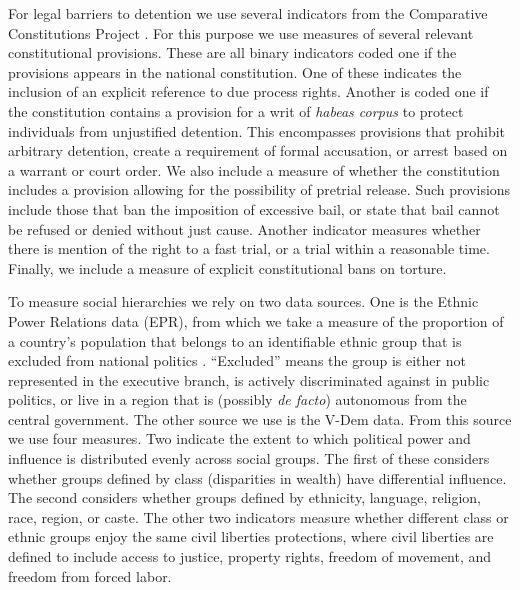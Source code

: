 \documentclass[11pt]{article}
\begin{document}
For legal barriers to detention we use several indicators from the Comparative Constitutions Project \citep{CCP2014}. For this purpose we use measures of several relevant constitutional provisions. These are all binary indicators coded one if the provisions appears in the national constitution. One of these indicates the inclusion of an explicit reference to due process rights. Another is coded one if the constitution contains a provision for a writ of {\em habeas corpus} to protect individuals from unjustified detention. This encompasses provisions that prohibit arbitrary detention, create a requirement of formal accusation, or arrest based on a warrant or court order. We also include a measure of whether the constitution includes a provision allowing for the possibility of pretrial release. Such provisions include those that ban the imposition of excessive bail, or state that bail cannot be refused or denied without just cause. Another indicator measures whether there is mention of the right to a fast trial, or a trial within a reasonable time. Finally, we include a measure of explicit constitutional bans on torture. 

To measure social hierarchies we rely on two data sources. One is the Ethnic Power Relations data (EPR), from which we take a measure of the proportion of a country's population that belongs to an identifiable ethnic group that is excluded from national politics \citep{vogt2015integrating}. ``Excluded'' means the group is either not represented in the executive branch, is actively discriminated against in public politics, or live in a region that is (possibly {\em de facto}) autonomous from the central government.  The other source we use is the V-Dem data. From this source we use four measures. Two indicate the extent to which political power and influence is distributed evenly across social groups. The first of these considers whether groups defined by class (disparities in wealth) have differential influence. The second considers whether groups defined by ethnicity, language, religion, race, region, or caste. The other two indicators measure whether different class or ethnic groups enjoy the same civil liberties protections, where civil liberties are defined to include access to justice, property rights, freedom of movement, and freedom from forced labor. 
\end{document}
